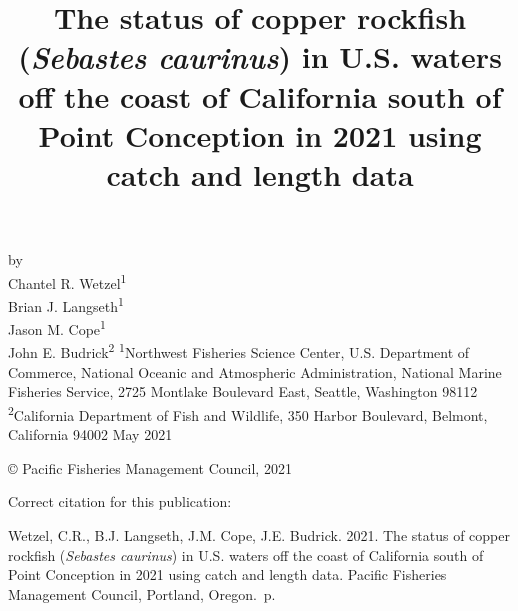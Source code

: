 \documentclass[11pt,
  english,
  a4paper,
]{article}
\date{}
\newcommand{\trTitle}{The status of copper rockfish (\emph{Sebastes caurinus}) in U.S. waters off the coast of California south of Point Conception in 2021 using catch and length data}
\newcommand{\trYear}{2021}
\newcommand{\trMonth}{May}
\newcommand{\trAuthsBack}{Wetzel, C.R., B.J. Langseth, J.M. Cope, J.E. Budrick}
\newcommand{\trCitation}{
\begin{hangparas}{1em}{1}
\trAuthsBack{}. \trYear{}. \trTitle{}. Pacific Fisheries Management Council, Portland, Oregon. \pageref{LastPage}{}\,p.
\end{hangparas}}
\begin{document}

\renewcommand*{\thefootnote}{\fnsymbol{footnote}}

\small
\thispagestyle{empty}
\noindent
\begin{center}
\title{The status of copper rockfish (\emph{Sebastes caurinus}) in U.S. waters off the coast of California south of Point Conception in 2021 using catch and length data}
\vspace{1.5cm}
{\Large\textbf{}}
\vfill
by\\
Chantel R. Wetzel\textsuperscript{1}\\
Brian J. Langseth\textsuperscript{1}\\
Jason M. Cope\textsuperscript{1}\\
John E. Budrick\textsuperscript{2}\vfill
\textsuperscript{1}Northwest Fisheries Science Center, U.S. Department of Commerce, National Oceanic and Atmospheric Administration, National Marine Fisheries Service, 2725 Montlake Boulevard East, Seattle, Washington 98112\\
\textsuperscript{2}California Department of Fish and Wildlife, 350 Harbor Boulevard, Belmont, California 94002\vfill
\trMonth{} \trYear{}
\end{center}
\clearpage

\thispagestyle{empty}
\vspace*{\fill}
\begin{center}
\copyright{} Pacific Fisheries Management Council, \trYear{}\\
\end{center}
\par
\bigskip
\noindent
Correct citation for this publication:
\bigskip
\par
\trCitation{}
\clearpage


\tableofcontents\clearpage
\label{TRlastRoman}
\clearpage

\newpage
\thispagestyle{empty} %
\end{document}
